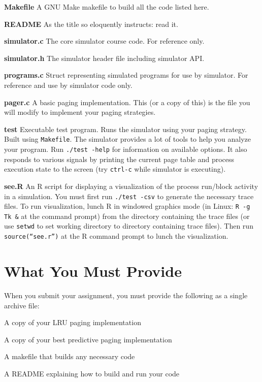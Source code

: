 \documentclass[12pt]{article}
\newenvironment{packed_enum}{
\begin{enumerate}
  \setlength{\itemsep}{1pt}
  \setlength{\parskip}{0pt}
  \setlength{\parsep}{0pt}
}{\end{enumerate}}
\begin{document}
\begin{packed_enum}
\item {\bf Makefile} A GNU Make makefile to build all the code listed
  here.
\item {\bf README} As the title so eloquently instructs: read it.
\item {\bf simulator.c} The core simulator course code. For reference
  only.
\item {\bf simulator.h} The simulator header file including simulator
  API.
\item {\bf programs.c} Struct representing simulated programs for use
  by simulator. For reference and use by simulator code only.
\item {\bf pager.c} A basic paging implementation. This (or a copy of
  this) is the file you will modify to implement your paging
  strategies.
\item {\bf test} Executable test program. Runs the simulator using
  your paging strategy. Built using \texttt{Makefile}. The simulator
  provides a lot of tools to help you analyze your program.
  Run \texttt{./test -help} for information on available options. It
  also responds to various signals by printing the current page table
  and process execution state to the screen (try \texttt{ctrl-c} while
  simulator is executing).
\item {\bf see.R} An R script for displaying a visualization of the
  process run/block activity in a simulation.
  You must first run \texttt{./test -csv} to
  generate the necessary trace files. To run visualization, lunch R in
  windowed graphics mode (in Linux: \texttt{R -g Tk \&} at the command
  prompt) from the directory containing the trace
  files (or use \texttt{setwd} to set working directory to directory
  containing trace files). Then run \texttt{source(``see.r'')} at the R
  command prompt to lunch the visualization.
\end{packed_enum}

\section{What You Must Provide}

When you submit your assignment, you must provide the following as a
single archive file:
\begin{packed_enum}
\item A copy of your LRU paging implementation
\item A copy of your best predictive paging implementation
\item A makefile that builds any necessary code
\item A README explaining how to build and run your code
\end{packed_enum}
\end{document}
